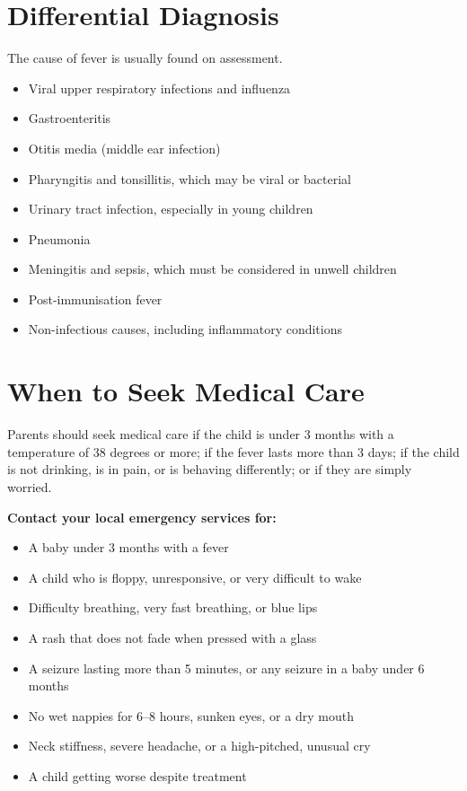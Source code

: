 \section*{Differential Diagnosis}
The cause of fever is usually found on assessment.
\begin{itemize}
    \item Viral upper respiratory infections and influenza
    \item Gastroenteritis
    \item Otitis media (middle ear infection)
    \item Pharyngitis and tonsillitis, which may be viral or bacterial
    \item Urinary tract infection, especially in young children
    \item Pneumonia
    \item Meningitis and sepsis, which must be considered in unwell children
    \item Post-immunisation fever
    \item Non-infectious causes, including inflammatory conditions
\end{itemize}

\section*{When to Seek Medical Care}
Parents should seek medical care if the child is under 3 months with a temperature of 38 degrees or more; if the fever lasts more than 3 days; if the child is not drinking, is in pain, or is behaving differently; or if they are simply worried.

\textbf{Contact your local emergency services for:}
\begin{itemize}
    \item A baby under 3 months with a fever
    \item A child who is floppy, unresponsive, or very difficult to wake
    \item Difficulty breathing, very fast breathing, or blue lips
    \item A rash that does not fade when pressed with a glass
    \item A seizure lasting more than 5 minutes, or any seizure in a baby under 6 months
    \item No wet nappies for 6--8 hours, sunken eyes, or a dry mouth
    \item Neck stiffness, severe headache, or a high-pitched, unusual cry
    \item A child getting worse despite treatment
\end{itemize}

